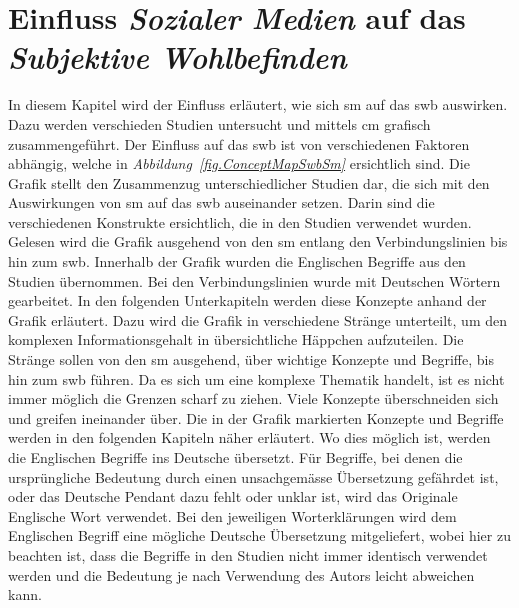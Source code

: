 %
%
\thispagestyle{empty}
\chapter{Einfluss \textit{Sozialer Medien} auf das \textit{Subjektive Wohlbefinden}}\label{chap.einfluss}
In diesem Kapitel wird der Einfluss erläutert, wie sich \gls{sm} auf das \gls{swb} auswirken. Dazu werden verschieden Studien untersucht und mittels \gls{cm} grafisch zusammengeführt. Der Einfluss auf das \gls{swb} ist von verschiedenen Faktoren abhängig, welche in \textit{Abbildung~\ref{fig.ConceptMapSwbSm}} ersichtlich sind.\newline
Die Grafik stellt den Zusammenzug unterschiedlicher Studien dar, die sich mit den Auswirkungen von \gls{sm} auf das \gls{swb} auseinander setzen. Darin sind die verschiedenen Konstrukte ersichtlich, die in den Studien verwendet wurden. Gelesen wird die Grafik ausgehend von den \gls{sm} entlang den Verbindungslinien bis hin zum \gls{swb}.\newline
Innerhalb der Grafik wurden die Englischen Begriffe aus den Studien übernommen. Bei den Verbindungslinien wurde mit Deutschen Wörtern gearbeitet.\newline
In den folgenden Unterkapiteln werden diese Konzepte anhand der Grafik erläutert. Dazu wird die Grafik in verschiedene Stränge unterteilt, um den komplexen Informationsgehalt in übersichtliche Häppchen aufzuteilen. Die Stränge sollen von den \gls{sm} ausgehend, über wichtige Konzepte und Begriffe, bis hin zum \gls{swb} führen. Da es sich um eine komplexe Thematik handelt, ist es nicht immer möglich die Grenzen scharf zu ziehen. Viele Konzepte überschneiden sich und greifen ineinander über.\newline 
Die in der Grafik markierten Konzepte und Begriffe werden in den folgenden Kapiteln näher erläutert. Wo dies möglich ist, werden die Englischen Begriffe ins Deutsche übersetzt. Für Begriffe, bei denen die ursprüngliche Bedeutung durch einen unsachgemässe Übersetzung gefährdet ist, oder das Deutsche Pendant dazu fehlt oder unklar ist, wird das Originale Englische Wort verwendet. Bei den jeweiligen Worterklärungen wird dem Englischen Begriff eine mögliche Deutsche Übersetzung mitgeliefert, wobei hier zu beachten ist, dass die Begriffe in den Studien nicht immer identisch verwendet werden und die Bedeutung je nach Verwendung des Autors leicht abweichen kann.\newline 


